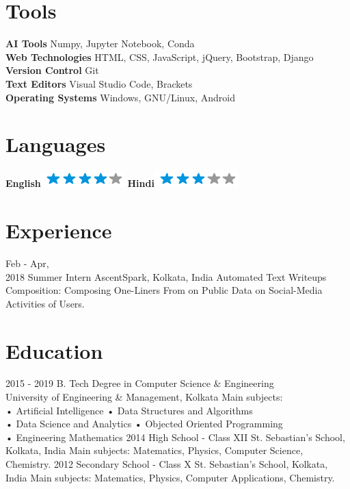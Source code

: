\documentclass[]{friggeri-cv}
\begin{document}
\begin{aside}
  \section{Tools}
    \textbf{AI Tools} {Numpy, Jupyter Notebook, Conda}
    \textbf{\\Web Technologies} {HTML, CSS, JavaScript, jQuery, Bootstrap, Django}
    \textbf{\\Version Control} {Git}
    \textbf{\\Text Editors} {Visual Studio Code, Brackets}
    \textbf{\\Operating Systems} {Windows, GNU/Linux, Android}
    ~
  \section{Languages}
    \textbf{English}\includegraphics[scale=0.40]{img/4stars.png}
    \textbf{Hindi}\includegraphics[scale=0.40]{img/3stars.png}
    ~
\end{aside}

\section{Experience}
\begin{entrylist}
    \entry
    {Feb - Apr, \\ 2018}
    {Summer Intern}
    {AscentSpark, Kolkata, India}
    {Automated Text Writeups Composition: Composing One-Liners From on Public Data on Social-Media Activities of Users.}
\end{entrylist}

\section{Education}
\begin{entrylist}
  \entry
    {2015 - 2019}
    {B. Tech Degree in Computer Science \& Engineering\\}
    {University of Engineering \& Management, Kolkata}
    {Main subjects: \\
        • Artificial Intelligence \qquad \qquad \qquad
        • Data Structures and Algorithms\\
        • Data Science and Analytics \quad \quad \hspace{1mm}
        • Objected Oriented Programming\\
        • Engineering Mathematics
    }
  \entry
    {2014}
    {High School - Class XII}
    {St. Sebastian's School, Kolkata, India}
    {Main subjects: Matematics, Physics, Computer Science, Chemistry.}
   \entry
    {2012}
    {Secondary School - Class X}
    {St. Sebastian's School, Kolkata, India}
    {Main subjects: Matematics, Physics, Computer Applications, Chemistry.}
\end{entrylist}
\end{document}
